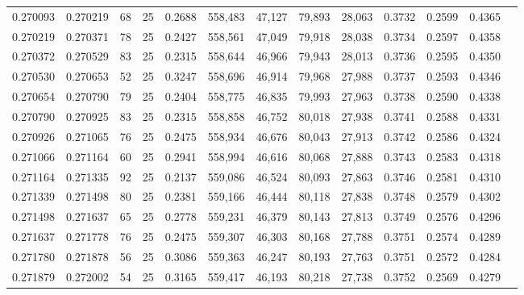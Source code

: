 \begin{tabular}{rrrrrrrrrrrrr}
0.270093 & 0.270219 &    68 &  25 &                                     0.2688 & 558,483 &  47,127 &  79,893 &  28,063 & 0.3732 & 0.2599 & 0.4365 \\
0.270219 & 0.270371 &    78 &  25 &                                     0.2427 & 558,561 &  47,049 &  79,918 &  28,038 & 0.3734 & 0.2597 & 0.4358 \\
0.270372 & 0.270529 &    83 &  25 &                                     0.2315 & 558,644 &  46,966 &  79,943 &  28,013 & 0.3736 & 0.2595 & 0.4350 \\
0.270530 & 0.270653 &    52 &  25 &                                     0.3247 & 558,696 &  46,914 &  79,968 &  27,988 & 0.3737 & 0.2593 & 0.4346 \\
0.270654 & 0.270790 &    79 &  25 &                                     0.2404 & 558,775 &  46,835 &  79,993 &  27,963 & 0.3738 & 0.2590 & 0.4338 \\
0.270790 & 0.270925 &    83 &  25 &                                     0.2315 & 558,858 &  46,752 &  80,018 &  27,938 & 0.3741 & 0.2588 & 0.4331 \\
0.270926 & 0.271065 &    76 &  25 &                                     0.2475 & 558,934 &  46,676 &  80,043 &  27,913 & 0.3742 & 0.2586 & 0.4324 \\
0.271066 & 0.271164 &    60 &  25 &                                     0.2941 & 558,994 &  46,616 &  80,068 &  27,888 & 0.3743 & 0.2583 & 0.4318 \\
0.271164 & 0.271335 &    92 &  25 &                                     0.2137 & 559,086 &  46,524 &  80,093 &  27,863 & 0.3746 & 0.2581 & 0.4310 \\
0.271339 & 0.271498 &    80 &  25 &                                     0.2381 & 559,166 &  46,444 &  80,118 &  27,838 & 0.3748 & 0.2579 & 0.4302 \\
0.271498 & 0.271637 &    65 &  25 &                                     0.2778 & 559,231 &  46,379 &  80,143 &  27,813 & 0.3749 & 0.2576 & 0.4296 \\
0.271637 & 0.271778 &    76 &  25 &                                     0.2475 & 559,307 &  46,303 &  80,168 &  27,788 & 0.3751 & 0.2574 & 0.4289 \\
0.271780 & 0.271878 &    56 &  25 &                                     0.3086 & 559,363 &  46,247 &  80,193 &  27,763 & 0.3751 & 0.2572 & 0.4284 \\
0.271879 & 0.272002 &    54 &  25 &                                     0.3165 & 559,417 &  46,193 &  80,218 &  27,738 & 0.3752 & 0.2569 & 0.4279 \\

\end{tabular}
